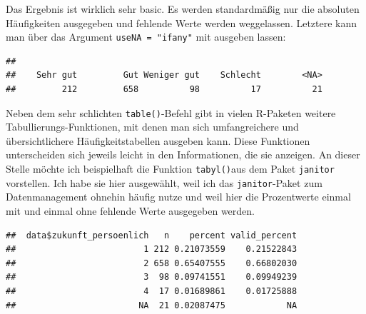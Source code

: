 \documentclass[
]{book}
\newenvironment{Shaded}{\begin{snugshade}}{\end{snugshade}}
\newcommand{\AttributeTok}[1]{\textcolor[rgb]{0.77,0.63,0.00}{#1}}
\newcommand{\CommentTok}[1]{\textcolor[rgb]{0.56,0.35,0.01}{\textit{#1}}}
\newcommand{\FunctionTok}[1]{\textcolor[rgb]{0.00,0.00,0.00}{#1}}
\newcommand{\NormalTok}[1]{#1}
\newcommand{\SpecialCharTok}[1]{\textcolor[rgb]{0.00,0.00,0.00}{#1}}
\newcommand{\StringTok}[1]{\textcolor[rgb]{0.31,0.60,0.02}{#1}}
\begin{document}
Das Ergebnis ist wirklich sehr basic. Es werden standardmäßig nur die absoluten Häufigkeiten ausgegeben und fehlende Werte werden weggelassen. Letztere kann man über das Argument \texttt{useNA\ =\ "ifany"} mit ausgeben lassen:

\begin{Shaded}
\end{Shaded}

\begin{verbatim}
## 
##    Sehr gut         Gut Weniger gut    Schlecht        <NA> 
##         212         658          98          17          21
\end{verbatim}

Neben dem sehr schlichten \texttt{table()}-Befehl gibt in vielen R-Paketen weitere Tabullierungs-Funktionen, mit denen man sich umfangreichere und übersichtlichere Häufigkeitstabellen ausgeben kann. Diese Funktionen unterscheiden sich jeweils leicht in den Informationen, die sie anzeigen. An dieser Stelle möchte ich beispielhaft die Funktion \texttt{tabyl()}aus dem Paket \texttt{janitor} vorstellen. Ich habe sie hier ausgewählt, weil ich das \texttt{janitor}-Paket zum Datenmanagement ohnehin häufig nutze und weil hier die Prozentwerte einmal mit und einmal ohne fehlende Werte ausgegeben werden.

\begin{Shaded}
\end{Shaded}

\begin{verbatim}
##  data$zukunft_persoenlich   n    percent valid_percent
##                         1 212 0.21073559    0.21522843
##                         2 658 0.65407555    0.66802030
##                         3  98 0.09741551    0.09949239
##                         4  17 0.01689861    0.01725888
##                        NA  21 0.02087475            NA
\end{verbatim}
\end{document}
